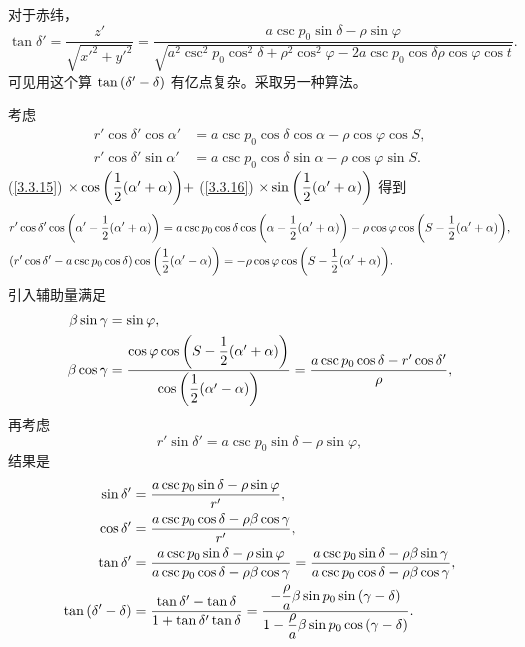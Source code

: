 \documentclass[UTF8, 12pt, a4paper, oneside, onecolumn, fontset=none]{ctexart}
\begin{document}
对于赤纬，
\begin{equation}
\tan{\delta'}=\frac{z'}{\sqrt{x'^{2}+y'^{2}}}=\frac{a\csc{p_{0}}\sin{\delta}-\rho\sin{\varphi}}{\sqrt{a^{2}\csc^{2}{p_{0}}\cos^{2}{\delta}+\rho^{2}\cos^{2}{\varphi}-2a\csc{p_{0}}\cos{\delta}\rho\cos{\varphi}\cos{t}}}.
\end{equation}
可见用这个算 $\tan{\mleft(\delta'-\delta\mright)}$ 有亿点复杂。采取另一种算法。

考虑
\begin{align}
r'\cos{\delta'}\cos{\alpha'}&=a\csc{p_{0}}\cos{\delta}\cos{\alpha}-\rho\cos{\varphi}\cos{S},\label{3.3.15}\\
r'\cos{\delta'}\sin{\alpha'}&=a\csc{p_{0}}\cos{\delta}\sin{\alpha}-\rho\cos{\varphi}\sin{S}.\label{3.3.16}
\end{align}
(\ref{3.3.15}) $\times\cos{\mleft(\dfrac{1}{2}\mleft(\alpha'+\alpha\mright)\mright)}+$ (\ref{3.3.16}) $\times\sin{\mleft(\dfrac{1}{2}\mleft(\alpha'+\alpha\mright)\mright)}$ 得到
\begin{align}
&r'\cos{\delta'}\cos{\mleft(\alpha'-\frac{1}{2}\mleft(\alpha'+\alpha\mright)\mright)}=a\csc{p_{0}}\cos{\delta}\cos{\mleft(\alpha-\frac{1}{2}\mleft(\alpha'+\alpha\mright)\mright)}-\rho\cos{\varphi}\cos{\mleft(S-\frac{1}{2}\mleft(\alpha'+\alpha\mright)\mright)},\\
&\mleft(r'\cos{\delta'}-a\csc{p_{0}}\cos{\delta}\mright)\cos{\mleft(\frac{1}{2}\mleft(\alpha'-\alpha\mright)\mright)}=-\rho\cos{\varphi}\cos{\mleft(S-\frac{1}{2}\mleft(\alpha'+\alpha\mright)\mright)}.
\end{align}
引入辅助量满足
\begin{align}
\beta\sin{\gamma}&=\sin{\varphi},\\
\beta\cos{\gamma}&=\frac{\cos{\varphi}\cos{\mleft(S-\dfrac{1}{2}\mleft(\alpha'+\alpha\mright)\mright)}}{\cos{\mleft(\dfrac{1}{2}\mleft(\alpha'-\alpha\mright)\mright)}}=\frac{a\csc{p_{0}}\cos{\delta}-r'\cos{\delta'}}{\rho},
\end{align}
再考虑
\begin{equation}
r'\sin{\delta'}=a\csc{p_{0}}\sin{\delta}-\rho\sin{\varphi},
\end{equation}
结果是
\begin{align}
\sin{\delta'}&=\frac{a\csc{p_{0}}\sin{\delta}-\rho\sin{\varphi}}{r'},\\
\cos{\delta'}&=\frac{a\csc{p_{0}}\cos{\delta}-\rho\beta\cos{\gamma}}{r'},\\
\tan{\delta'}&=\frac{a\csc{p_{0}}\sin{\delta}-\rho\sin{\varphi}}{a\csc{p_{0}}\cos{\delta}-\rho\beta\cos{\gamma}}=\frac{a\csc{p_{0}}\sin{\delta}-\rho\beta\sin{\gamma}}{a\csc{p_{0}}\cos{\delta}-\rho\beta\cos{\gamma}},\\
\tan{\mleft(\delta'-\delta\mright)}&=\frac{\tan{\delta'}-\tan{\delta}}{1+\tan{\delta'}\tan{\delta}}=\frac{-\dfrac{\rho}{a}\beta\sin{p_{0}}\sin{\mleft(\gamma-\delta\mright)}}{1-\dfrac{\rho}{a}\beta\sin{p_{0}}\cos{\mleft(\gamma-\delta\mright)}}.
\end{align}
\end{document}
